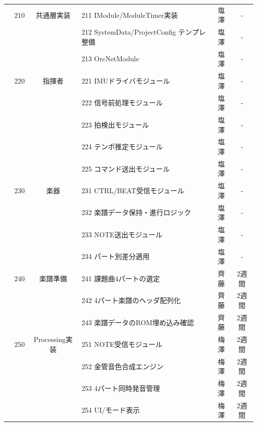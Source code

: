 \documentclass[a4j,11pt,dvipdfmx]{jsarticle}
\begin{document}
\begin{table}[htbp]
\begin{tabular}{|c|c|c|p{5cm}|c|c|}
& 210 & 共通層実装 & 211 IModule/ModuleTimer実装 & 塩澤 & - \\ 
& & & 212 SystemData/ProjectConfig テンプレ整備 & 塩澤 & - \\ 
& & & 213 OrcNetModule & 塩澤 & - \\ 
& 220 & 指揮者 & 221 IMUドライバモジュール & 塩澤 & - \\ 
& & & 222 信号前処理モジュール & 塩澤 & - \\ 
& & & 223 拍検出モジュール & 塩澤 & - \\ 
& & & 224 テンポ推定モジュール & 塩澤 & - \\ 
& & & 225 コマンド送出モジュール & 塩澤 & - \\ 
& 230 & 楽器 & 231 CTRL/BEAT受信モジュール & 塩澤 & - \\ 
& & & 232 楽譜データ保持・進行ロジック & 塩澤 & - \\ 
& & & 233 NOTE送出モジュール & 塩澤 & - \\ 
& & & 234 パート別差分適用 & 塩澤 & - \\ 
& 240 & 楽譜準備 & 241 課題曲4パートの選定 & 齊藤 & 2週間 \\ 
& & & 242 4パート楽譜のヘッダ配列化 & 齊藤 & 2週間 \\ 
& & & 243 楽譜データのROM埋め込み確認 & 齊藤 & 2週間 \\ 
& 250 & Processing実装 & 251 NOTE受信モジュール & 梅澤 & 2週間 \\ 
& & & 252 金管音色合成エンジン & 梅澤 & 2週間 \\ 
& & & 253 4パート同時発音管理 & 梅澤 & 2週間 \\ 
& & & 254 UI/モード表示 & 梅澤 & 2週間 \\ \hline

\end{tabular}
\end{table}
\end{document}
